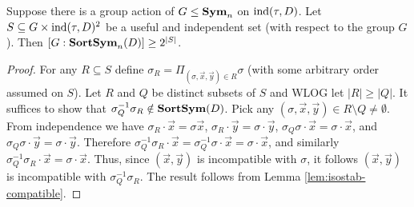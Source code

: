 \documentclass[../paper.tex]{subfiles}
\begin{document}


\begin{lem}
  \label{lem:useful-independant-set}
  Suppose there is a group action of $G \leq \text{\textbf{Sym}}_n$ on $\text{\upshape ind}(\tau, D)$. Let $S
  \subseteq G \times \text{\upshape ind}(\tau, D)^2$ be a useful and independent set (with
  respect to the group $G$). Then $[G : \text{\textbf{SortSym}}_n(D)] \geq 2^{\vert S \vert}$.
\end{lem}

\begin{proof}
  For any $R \subseteq S$ define $\sigma_R = \Pi_{(\sigma, \vec{x}, \vec{y}) \in
    R} \sigma$ (with some arbitrary order assumed on $S$). Let $R$ and $Q$ be
  distinct subsets of $S$ and WLOG let $\vert R \vert \geq \vert Q \vert$. It
  suffices to show that $\sigma^{-1}_Q \sigma_R \notin \text{\textbf{SortSym}} (D)$. Pick any
  $(\sigma, \vec{x}, \vec{y}) \in R \setminus Q \neq \emptyset$.
  From independence we have $\sigma_R \cdot \vec{x} = \sigma \vec{x}$, $\sigma_R
  \cdot \vec{y} = \sigma \cdot \vec{y}$, $\sigma_Q \sigma \cdot \vec{x} = \sigma
  \cdot \vec{x} $, and $\sigma_Q \sigma \cdot \vec{y} = \sigma \cdot \vec{y}$.
  Therefore $\sigma^{-1}_Q \sigma_R \cdot \vec{x} = \sigma^{-1}_Q \sigma \cdot
  \vec{x} = \sigma \cdot \vec{x}$, and similarly $\sigma^{-1}_Q\sigma_R \cdot
  \vec{x} = \sigma \cdot \vec{x}$. Thus, since $(\vec{x}, \vec{y})$ is
  incompatible with $\sigma$, it follows $(\vec{x}, \vec{y})$ is incompatible
  with $\sigma^{-1}_Q\sigma_R$. The result follows from Lemma
  \ref{lem:isostab-compatible}.
\end{proof}

\end{document}
